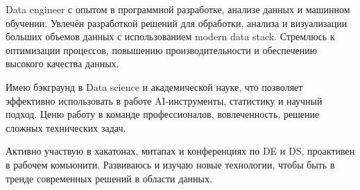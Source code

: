 

\begin{cvparagraph}

Data engineer с опытом в программной разработке, анализе данных и машинном обучении. Увлечён разработкой решений для обработки, анализа и визуализации больших объемов данных с использованием modern data stack. Стремлюсь к оптимизации процессов, повышению производительности и обеспечению высокого качества данных.

Имею бэкграунд в Data science и академической науке, что позволяет эффективно использовать в работе AI-инструменты, статистику и научный подход. Ценю работу в команде профессионалов, вовлеченность, решение сложных технических задач.

Активно участвую в хакатонах, митапах и конференциях по DE и DS, проактивен в рабочем комьюнити. Развиваюсь и изучаю новые технологии, чтобы быть в тренде современных решений в области данных.
\end{cvparagraph}
